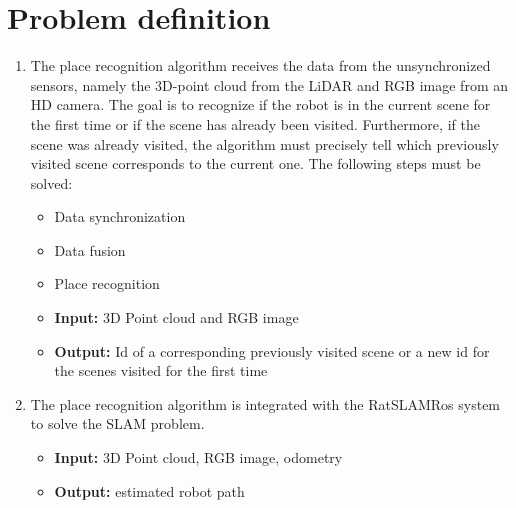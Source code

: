 \section{Problem definition}

\begin{enumerate}
    \item The place recognition algorithm receives the data from the unsynchronized sensors, namely the 3D-point cloud from the LiDAR and RGB image from an HD camera. The goal is to recognize if the robot is in the current scene for the first time or if the scene has already been visited. Furthermore, if the scene was already visited, the algorithm must precisely tell which previously visited scene corresponds to the current one. The following steps must be solved:
          \begin{itemize}
              \item Data synchronization
              \item Data fusion
              \item Place recognition
                    \\
              \item \textbf{Input:} 3D Point cloud and RGB image
              \item \textbf{Output:} Id of a corresponding previously visited scene or a new id for the scenes visited for the first time
          \end{itemize}
    \item The place recognition algorithm is integrated with the RatSLAMRos system to solve the SLAM problem.
          \begin{itemize}
              \item \textbf{Input:} 3D Point cloud, RGB image, odometry
              \item \textbf{Output:} estimated robot path
          \end{itemize}
\end{enumerate}